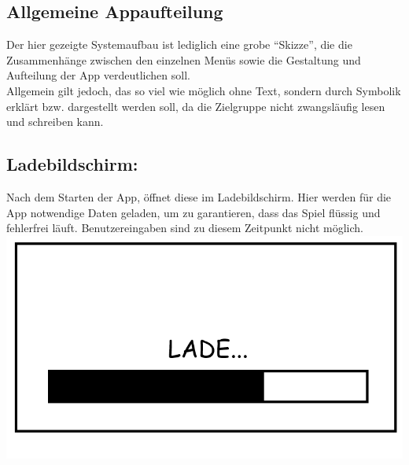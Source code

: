 \documentclass{scrartcl}
\begin{document}
\subsection{Allgemeine Appaufteilung}

Der hier gezeigte Systemaufbau ist lediglich eine grobe \enquote{Skizze},
die die Zusammenhänge zwischen den einzelnen Menüs sowie
die Gestaltung und Aufteilung der App verdeutlichen soll.\\
Allgemein gilt jedoch, das so viel wie möglich ohne Text, sondern durch Symbolik erklärt bzw. dargestellt werden soll, da die Zielgruppe nicht zwangsläufig lesen und schreiben kann.\\

\begin{enumerate}
	\begin{minipage}{1\textwidth}
		\item \subsection*{Ladebildschirm:} \label{appaufbau:Ladebildschirm}
		Nach dem Starten der App, öffnet diese im Ladebildschirm. Hier werden für die App notwendige Daten geladen, um zu garantieren, dass das Spiel flüssig und fehlerfrei läuft. Benutzereingaben sind zu diesem Zeitpunkt nicht möglich.\\
		\includegraphics[scale=0.5]{assets/LoadScreen}
	\end{minipage}
	
	\begin{minipage}{1\textwidth}
		

\end{minipage}
\end{enumerate}
\end{document}
